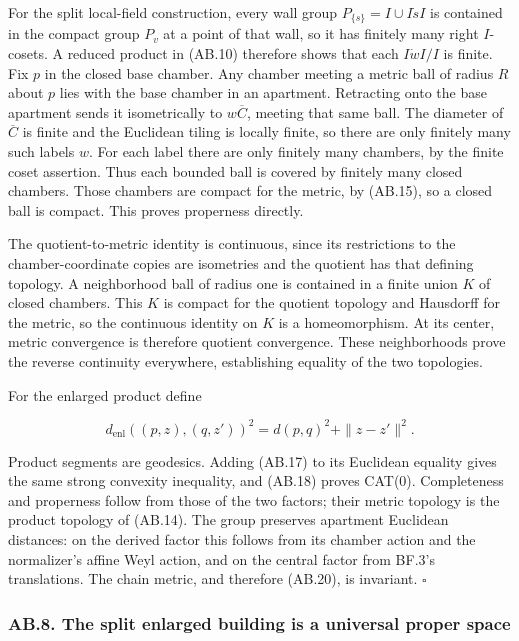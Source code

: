 \documentclass[
  11pt,
]{article}
\begin{document}
For the split local-field construction, every wall group
\(P_{\{s\}}=I\cup I\dot sI\) is contained in the compact group \(P_v\)
at a point of that wall, so it has finitely many right \(I\)-cosets. A
reduced product in (AB.10) therefore shows that each \(I\dot wI/I\) is
finite. Fix \(p\) in the closed base chamber. Any chamber meeting a
metric ball of radius \(R\) about \(p\) lies with the base chamber in an
apartment. Retracting onto the base apartment sends it isometrically to
\(w\overline C\), meeting that same ball. The diameter of
\(\overline C\) is finite and the Euclidean tiling is locally finite, so
there are only finitely many such labels \(w\). For each label there are
only finitely many chambers, by the finite coset assertion. Thus each
bounded ball is covered by finitely many closed chambers. Those chambers
are compact for the metric, by (AB.15), so a closed ball is compact.
This proves properness directly.

The quotient-to-metric identity is continuous, since its restrictions to
the chamber-coordinate copies are isometries and the quotient has that
defining topology. A neighborhood ball of radius one is contained in a
finite union \(K\) of closed chambers. This \(K\) is compact for the
quotient topology and Hausdorff for the metric, so the continuous
identity on \(K\) is a homeomorphism. At its center, metric convergence
is therefore quotient convergence. These neighborhoods prove the reverse
continuity everywhere, establishing equality of the two topologies.

For the enlarged product define

\[
 d_{\mathrm{enl}}((p,z),(q,z'))^2=d(p,q)^2+\|z-z'\|^2.
 \tag{AB.20}
\]

Product segments are geodesics. Adding (AB.17) to its Euclidean equality
gives the same strong convexity inequality, and (AB.18) proves CAT(0).
Completeness and properness follow from those of the two factors; their
metric topology is the product topology of (AB.14). The group preserves
apartment Euclidean distances: on the derived factor this follows from
its chamber action and the normalizer's affine Weyl action, and on the
central factor from BF.3's translations. The chain metric, and therefore
(AB.20), is invariant. \(\square\)

\subsubsection{AB.8. The split enlarged building is a universal proper
space}\label{ab.8.-the-split-enlarged-building-is-a-universal-proper-space}
\end{document}
